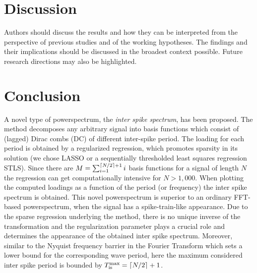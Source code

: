 \documentclass[entropy,article,submit,pdftex,moreauthors]{Definitions/mdpi}
\DeclarePairedDelimiter\ceil{\lceil}{\rceil}
\begin{document}
\section{Discussion}

Authors should discuss the results and how they can be interpreted from the perspective of previous studies and of the working hypotheses. The findings and their implications should be discussed in the broadest context possible. Future research directions may also be highlighted.

\section{Conclusion}\label{sec_tau_rr_conclusion}

A novel type of powerspectrum, the \textit{inter spike spectrum}, has been proposed. The method decomposes any arbitrary signal into basis functions which consist of (lagged) Dirac 
combs (DC) of different inter-spike period. The loading for each period is obtained by a regularized regression, which promotes sparsity in its solution (we chose LASSO or a sequentially 
thresholded least squares regression STLS). Since there are 
$M = \sum_{i=1}^{\ceil*{N/2}+1}i$ basis functions for a signal of length $N$ the regression can get computationally intensive for $N>1,000$. When plotting the computed loadings as a function 
of the period (or frequency) the inter spike spectrum is obtained. This novel powerspectrum is superior to an ordinary FFT-based powerspectrum, when the signal has a spike-train-like 
appearance. Due to the sparse regression underlying the method, there is no unique inverse of the transformation and the regularization parameter plays a crucial role and determines the 
appearance of the obtained inter spike spectrum. Moreover, similar to the Nyquist frequency barrier in the Fourier Transform which sets a lower bound for the corresponding wave period, here 
the maximum considered inter spike period is bounded by $T_{\text{is}}^{\text{max}} = \ceil*{N/2}+1$.
\end{document}
